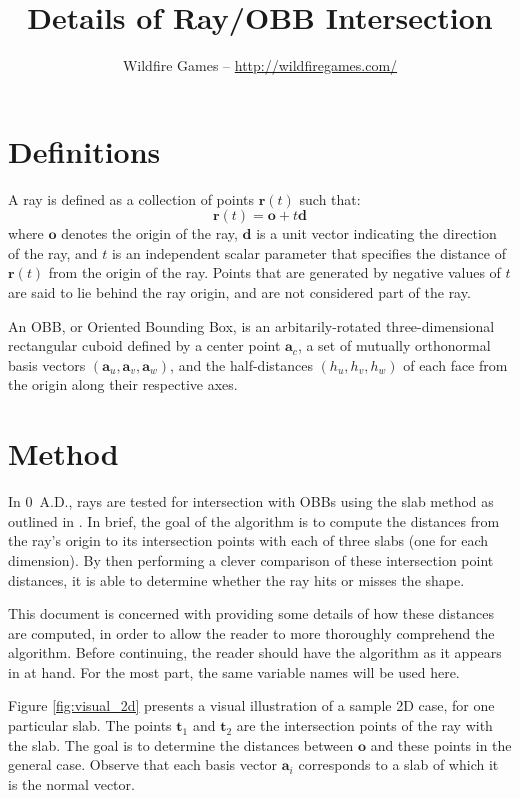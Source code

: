 \documentclass[a4paper,10pt]{article}
\title{Details of Ray/OBB Intersection}
\author{Wildfire Games -- \url{http://wildfiregames.com/}}
\begin{document}
\maketitle

\section{Definitions}
A ray is defined as a collection of points $\mathbf{r}(t)$ such that:
\begin{equation*}
\mathbf{r}(t) = \mathbf{o} + t \mathbf{d}
\end{equation*}
where $\mathbf{o}$ denotes the origin of the ray, $\mathbf{d}$ is a unit vector indicating the direction of the ray, and $t$ is an independent scalar parameter that specifies the distance of $\mathbf{r}(t)$ from the origin of the ray. Points that are generated by negative values of $t$ are said to lie behind the ray origin, and are not considered part of the ray.

An OBB, or Oriented Bounding Box, is an arbitarily-rotated three-dimensional rectangular cuboid defined by a center point $\mathbf{a}_c$, a set of mutually orthonormal basis vectors $(\mathbf{a}_u, \mathbf{a}_v, \mathbf{a}_w)$, and the half-distances $(h_u, h_v, h_w)$ of each face from the origin along their respective axes.

\section{Method}
In 0 A.D., rays are tested for intersection with OBBs using the slab method as outlined in \cite{real_time_rendering_3}. In brief, the goal of the algorithm is to compute the distances from the ray's origin to its intersection points with each of three slabs (one for each dimension). By then performing a clever comparison of these intersection point distances, it is able to determine whether the ray hits or misses the shape.

This document is concerned with providing some details of how these distances are computed, in order to allow the reader to more thoroughly comprehend the algorithm. Before continuing, the reader should have the algorithm as it appears in \cite{real_time_rendering_3} at hand. For the most part, the same variable names will be used here.

Figure \ref{fig:visual_2d} presents a visual illustration of a sample 2D case, for one particular slab. The points $\mathbf{t}_1$ and $\mathbf{t}_2$ are the intersection points of the ray with the slab. The goal is to determine the distances between $\mathbf{o}$ and these points in the general case. Observe that each basis vector $\mathbf{a}_i$ corresponds to a slab of which it is the normal vector.
\end{document}
